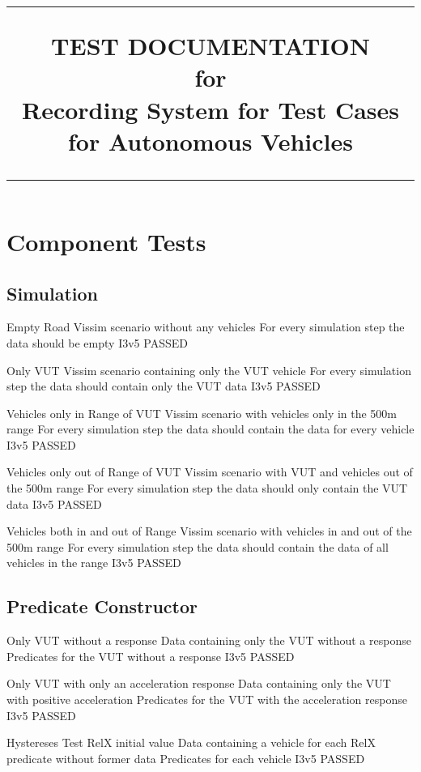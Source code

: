 \documentclass[a4paper, 11pt]{scrreprt}
\title{%
\flushright
\rule{16cm}{5pt}\vskip1cm
\Huge{TEST DOCUMENTATION}\\
\vspace{2cm}
for\\
\vspace{2cm}
Recording System for Test Cases for Autonomous Vehicles\\
\vfill
\rule{16cm}{5pt}
}
\date{}
\begin{document}
\maketitle

\tableofcontents

\chapter{Component Tests}

\section{Simulation}

	{Empty Road}
	{Vissim scenario without any vehicles}
	{For every simulation step the data should be empty}
	{I3v5}
	{PASSED}
	
	{Only VUT}
	{Vissim scenario containing only the VUT vehicle}
	{For every simulation step the data should contain only the VUT data}
	{I3v5}
	{PASSED}
	
	{Vehicles only in Range of VUT}
	{Vissim scenario with vehicles only in the 500m range}
	{For every simulation step the data should contain the data for every vehicle}
	{I3v5}
	{PASSED}
	
	{Vehicles only out of Range of VUT}
	{Vissim scenario with VUT and vehicles out of the 500m range}
	{For every simulation step the data should only contain the VUT data}
	{I3v5}
	{PASSED}
	
	{Vehicles both in and out of Range}
	{Vissim scenario with vehicles in and out of the 500m range}
	{For every simulation step the data should contain the data of all vehicles in the range}
	{I3v5}
	{PASSED}

\section{Predicate Constructor}
	
	{Only VUT without a response}
	{Data containing only the VUT without a response}
	{Predicates for the VUT without a response}
	{I3v5}
	{PASSED}
	
	{Only VUT with only an acceleration response}
	{Data containing only the VUT with positive acceleration}
	{Predicates for the VUT with the acceleration response}
	{I3v5}
	{PASSED}
	
	{Hystereses Test RelX initial value}
	{Data containing a vehicle for each RelX predicate without former data}
	{Predicates for each vehicle}
	{I3v5}
	{PASSED}
	
\end{document}
